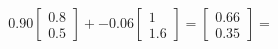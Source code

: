 \documentclass[preview]{standalone}
\begin{document}
\begin{align*}
0.90 \begin{bmatrix} 0.8 \\ 0.5 \end{bmatrix} + -0.06 \begin{bmatrix} 1 \\ 1.6 \end{bmatrix} = \begin{bmatrix} 0.66 \\ 0.35 \end{bmatrix} =
\end{align*}
\end{document}
